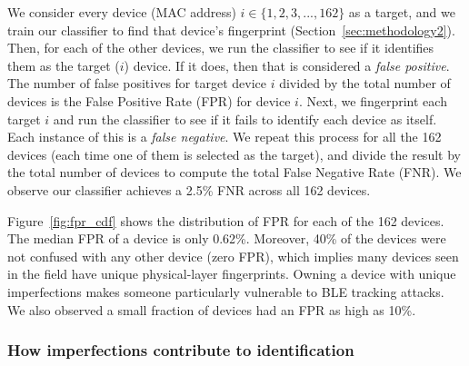 We consider every device (MAC address) $i \in \{1,2,3,...,162\}$ as a target,
and we train our classifier to find that device's fingerprint
(Section~\ref{sec:methodology2}).  Then, for each of the other devices, we run
the classifier to see if it identifies them as the target ($i$) device. If it
does, then that is considered a \emph{false positive}. The number of false
positives for target device $i$ divided by the total number of devices is the
False Positive Rate (FPR) for device $i$. Next, we fingerprint
each target $i$ and run the classifier to see if it fails to identify each device as
itself. Each instance of this is a \emph{false negative}. We repeat this process for all the 162 devices (each time one of
them is selected as the target), and divide the result by the total number of
devices to compute the total False Negative Rate (FNR). We observe our
classifier achieves a 2.5\% FNR across all 162 devices.



Figure~\ref{fig:fpr_cdf} shows the distribution of FPR for each of the 162 devices.
The median FPR of a device is only 0.62\%. Moreover, 40\%
of the devices were not confused with any other device (zero FPR), which implies many
devices seen in the field
have unique physical-layer fingerprints. Owning a device with unique 
imperfections makes someone particularly vulnerable to BLE tracking attacks. We also
observed
a small fraction of devices had an FPR as high as 10\%.


\subsubsection{How imperfections contribute to identification}

